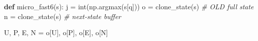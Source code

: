 \documentclass[
  a4paper,
]{ltjsarticle}
\newenvironment{Shaded}{}{}
\newcommand{\BuiltInTok}[1]{\textcolor[rgb]{0.00,0.50,0.00}{#1}}
\newcommand{\CommentTok}[1]{\textcolor[rgb]{0.38,0.63,0.69}{\textit{#1}}}
\newcommand{\KeywordTok}[1]{\textcolor[rgb]{0.00,0.44,0.13}{\textbf{#1}}}
\newcommand{\NormalTok}[1]{#1}
\newcommand{\OperatorTok}[1]{\textcolor[rgb]{0.40,0.40,0.40}{#1}}
\newcommand{\StringTok}[1]{\textcolor[rgb]{0.25,0.44,0.63}{#1}}
\begin{document}
\begin{Shaded}
\begin{Highlighting}[]
\KeywordTok{def}\NormalTok{ micro\_fast6(s):}
\NormalTok{    j }\OperatorTok{=} \BuiltInTok{int}\NormalTok{(np.argmax(s[}\StringTok{\textquotesingle{}q\textquotesingle{}}\NormalTok{]))}
\NormalTok{    o }\OperatorTok{=}\NormalTok{ clone\_state(s)          }\CommentTok{\# OLD full state}
\NormalTok{    n }\OperatorTok{=}\NormalTok{ clone\_state(s)          }\CommentTok{\# next{-}state buffer}

\NormalTok{    U, P, E, N }\OperatorTok{=}\NormalTok{ o[}\StringTok{\textquotesingle{}U\textquotesingle{}}\NormalTok{], o[}\StringTok{\textquotesingle{}P\textquotesingle{}}\NormalTok{], o[}\StringTok{\textquotesingle{}E\textquotesingle{}}\NormalTok{], o[}\StringTok{\textquotesingle{}N\textquotesingle{}}\NormalTok{]}


\end{Highlighting}
\end{Shaded}
\end{document}

